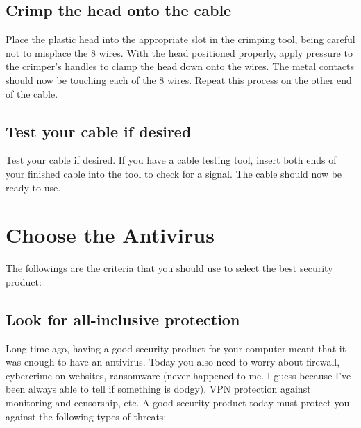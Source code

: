 \documentclass[a4paper,12pt]{book}
\begin{document}
\subsection{Crimp the head onto the cable}
Place the plastic head into the appropriate slot in the crimping tool, being careful not to misplace the 8 wires. With the head positioned properly, apply pressure to the crimper's handles to clamp the head down onto the wires. The metal contacts should now be touching each of the 8 wires. Repeat this process on the other end of the cable.

\subsection{Test your cable if desired}
Test your cable if desired. If you have a cable testing tool, insert both ends of your finished cable into the tool to check for a signal. The cable should now be ready to use.

\section{Choose the Antivirus}
The followings are the criteria that you should use to select the best security product:

\subsection{Look for all-inclusive protection}
Long time ago, having a good security product for your computer meant that it was enough to have an antivirus. Today you also need to worry about firewall, cybercrime on websites, ransomware (never happened to me. I guess because I've been always able to tell if something is dodgy), VPN protection against monitoring and censorship, etc.
A good security product today must protect you against the following types of threats:
\end{document}
